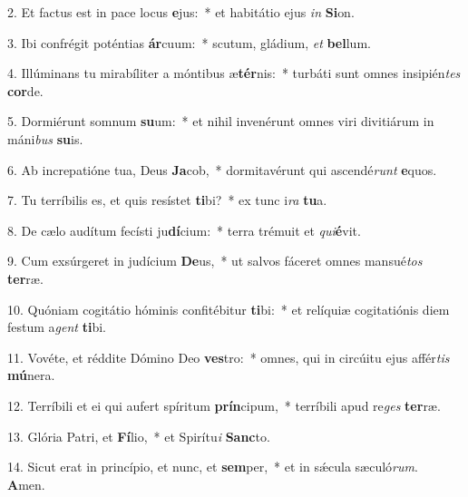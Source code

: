 2. Et factus est in pace locus \textbf{e}jus:~*  et habitátio ejus \textit{in} \textbf{Si}on.\

3. Ibi confrégit poténtias \textbf{ár}cuum:~*  scutum, gládium, \textit{et} \textbf{bel}lum.\

4. Illúminans tu mirabíliter a móntibus æ\textbf{tér}nis:~*  turbáti sunt omnes insipién\textit{tes} \textbf{cor}de.\

5. Dormiérunt somnum \textbf{su}um:~*  et nihil invenérunt omnes viri divitiárum in máni\textit{bus} \textbf{su}is.\

6. Ab increpatióne tua, Deus \textbf{Ja}cob,~*  dormitavérunt qui ascendé\textit{runt} \textbf{e}quos.\

7. Tu terríbilis es, et quis resístet \textbf{ti}bi?~*  ex tunc i\textit{ra} \textbf{tu}a.\

8. De cælo audítum fecísti ju\textbf{dí}cium:~*  terra trémuit et \textit{qui}\textbf{é}vit.\

9. Cum exsúrgeret in judícium \textbf{De}us,~*  ut salvos fáceret omnes mansué\textit{tos} \textbf{ter}ræ.\

10. Quóniam cogitátio hóminis confitébitur \textbf{ti}bi:~*  et relíquiæ cogitatiónis diem festum a\textit{gent} \textbf{ti}bi.\

11. Vovéte, et réddite Dómino Deo \textbf{ves}tro:~*  omnes, qui in circúitu ejus affér\textit{tis} \textbf{mú}nera.\

12. Terríbili et ei qui aufert spíritum \textbf{prín}cipum,~*  terríbili apud re\textit{ges} \textbf{ter}ræ.\

13. Glória Patri, et \textbf{Fí}lio,~*  et Spirítu\textit{i} \textbf{Sanc}to.\

14. Sicut erat in princípio, et nunc, et \textbf{sem}per,~*  et in sǽcula sæculó\textit{rum}. \textbf{A}men.\


